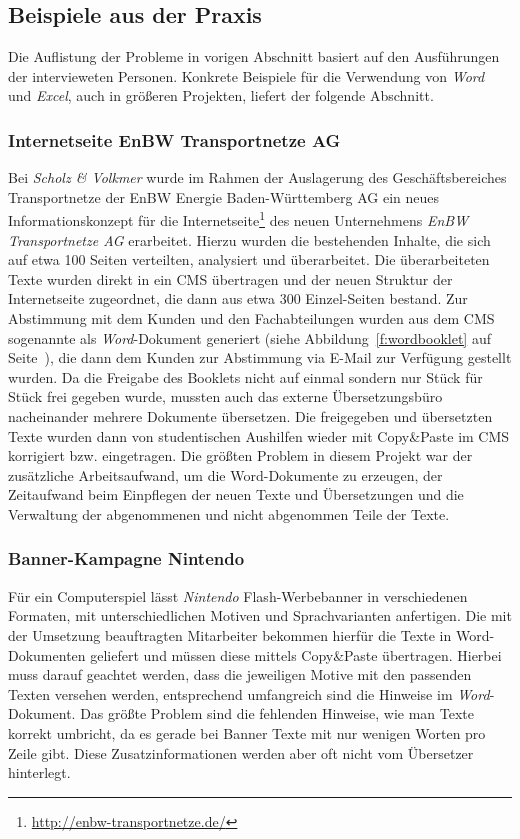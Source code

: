 \subsection{Beispiele aus der Praxis}\label{l:praxisbeispiele}

Die Auflistung der Probleme in vorigen Abschnitt basiert auf den Ausführungen der intervieweten Personen. Konkrete Beispiele für die Verwendung von \emph{Word} und \emph{Excel}, auch in größeren Projekten, liefert der folgende Abschnitt.

\subsubsection{Internetseite EnBW Transportnetze AG}

Bei \emph{Scholz \& Volkmer} wurde im Rahmen der Auslagerung des Geschäftsbereiches Transportnetze der EnBW Energie Baden-Württemberg AG ein neues Informationskonzept für die Internetseite\footnote{\url{http://enbw-transportnetze.de/}} des neuen Unternehmens \emph{EnBW Transportnetze AG} erarbeitet. Hierzu wurden die bestehenden Inhalte, die sich auf etwa 100 Seiten verteilten, analysiert und überarbeitet. Die überarbeiteten Texte wurden direkt in ein CMS übertragen und der neuen Struktur der Internetseite zugeordnet, die dann aus etwa 300 Einzel-Seiten bestand. Zur Abstimmung mit dem Kunden und den Fachabteilungen wurden aus dem CMS sogenannte  als \emph{Word}-Dokument generiert (siehe Abbildung~\ref{f:wordbooklet} auf Seite~\pageref{f:wordbooklet}), die dann dem Kunden zur Abstimmung via E-Mail zur Verfügung gestellt wurden. Da die Freigabe des Booklets nicht auf einmal sondern nur Stück für Stück frei gegeben wurde, mussten auch das externe Übersetzungsbüro nacheinander mehrere Dokumente übersetzen. Die freigegeben und übersetzten Texte wurden dann von studentischen Aushilfen wieder mit Copy\&Paste im CMS korrigiert bzw. eingetragen. Die größten Problem in diesem Projekt war der zusätzliche Arbeitsaufwand, um die Word-Dokumente zu erzeugen, der Zeitaufwand beim Einpflegen der neuen Texte und Übersetzungen und die Verwaltung der abgenommenen und nicht abgenommen Teile der Texte.

\subsubsection{Banner-Kampagne Nintendo}

Für ein Computerspiel lässt \emph{Nintendo} Flash-Werbebanner in verschiedenen Formaten, mit unterschiedlichen Motiven und Sprachvarianten anfertigen. Die mit der Umsetzung beauftragten Mitarbeiter bekommen hierfür die Texte in Word-Dokumenten geliefert und müssen diese mittels Copy\&Paste übertragen. Hierbei muss darauf geachtet werden, dass die jeweiligen Motive mit den passenden Texten versehen werden, entsprechend umfangreich sind die Hinweise im \emph{Word}-Dokument. Das größte Problem sind die fehlenden Hinweise, wie man Texte korrekt umbricht, da es gerade bei Banner Texte mit nur wenigen Worten pro Zeile gibt. Diese Zusatzinformationen werden aber oft nicht vom Übersetzer hinterlegt.

